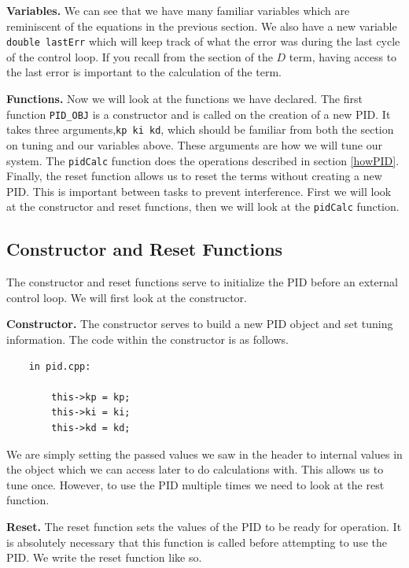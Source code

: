 \documentclass[12pt]{report}
\begin{document}
   \textbf{Variables.} We can see that we have many familiar variables which are reminiscent of the equations in the previous section. 
   We also have a new variable \verb|double lastErr| which will keep track of what the error was during the last cycle of the control loop.
   If you recall from the section of the $D$ term, 
   having access to the last error is important to the calculation of the term.

    \textbf{Functions.} Now we will look at the functions we have declared.
    The first function \verb|PID_OBJ| is a constructor and is called on the creation of a new PID. 
    It takes three arguments,\verb|kp ki kd|, which should be familiar from both the section on tuning and our variables above. 
    These arguments are how we will tune our system.
    The \verb|pidCalc| function does the operations described in section \ref{howPID}. 
    Finally, the reset function allows us to reset the terms without creating a new PID. 
    This is important between tasks to prevent interference.
    First we will look at the constructor and reset functions, then we will look at the \verb|pidCalc| function.

\subsection{Constructor and Reset Functions}
    The constructor and reset functions serve to initialize the PID before an external control loop. 
    We will first look at the constructor.

    \textbf{Constructor.} The constructor serves to build a new PID object and set tuning information. The code within the constructor is as follows.

    \begin{verbatim}
    in pid.cpp:

        this->kp = kp;
        this->ki = ki;
        this->kd = kd;
    \end{verbatim}

    We are simply setting the passed values we saw in the header to internal values in the object which we can access later to do calculations with.
    This allows us to tune once. 
    However, to use the PID multiple times we need to look at the rest function.

    \textbf{Reset.} The reset function sets the values of the PID to be ready for operation. 
    It is absolutely necessary that this function is called before attempting to use the PID.
    We write the reset function like so.
\end{document}

